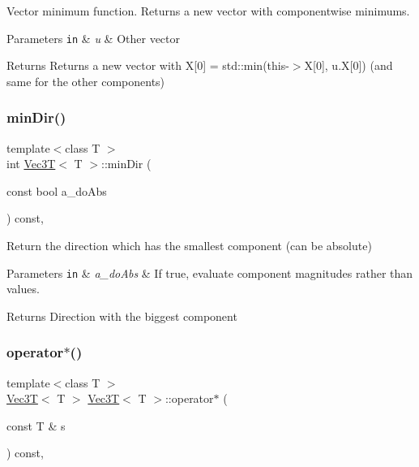 Vector minimum function. Returns a new vector with componentwise minimums. 


\begin{DoxyParams}[1]{Parameters}
\mbox{\tt in}  & {\em u} & Other vector \\
\hline
\end{DoxyParams}
\begin{DoxyReturn}{Returns}
Returns a new vector with X\mbox{[}0\mbox{]} = std\+::min(this-\/$>$X\mbox{[}0\mbox{]}, u.\+X\mbox{[}0\mbox{]}) (and same for the other components) 
\end{DoxyReturn}
\mbox{\label{classVec3T_add4db9b06b01f85ce492742acae86545}} 
\subsubsection{\texorpdfstring{min\+Dir()}{minDir()}}
{\footnotesize\ttfamily template$<$class T $>$ \\
int \hyperlink{classVec3T}{Vec3T}$<$ T $>$\+::min\+Dir (\begin{DoxyParamCaption}\item[{const bool}]{a\+\_\+do\+Abs }\end{DoxyParamCaption}) const\hspace{0.3cm}{\ttfamily [inline]}, {\ttfamily [noexcept]}}



Return the direction which has the smallest component (can be absolute) 


\begin{DoxyParams}[1]{Parameters}
\mbox{\tt in}  & {\em a\+\_\+do\+Abs} & If true, evaluate component magnitudes rather than values. \\
\hline
\end{DoxyParams}
\begin{DoxyReturn}{Returns}
Direction with the biggest component 
\end{DoxyReturn}
\mbox{\label{classVec3T_aa4768276707889db34a716e9e476b9f1}} 
\subsubsection{\texorpdfstring{operator$\ast$()}{operator*()}\hspace{0.1cm}{\footnotesize\ttfamily [1/2]}}
{\footnotesize\ttfamily template$<$class T $>$ \\
\hyperlink{classVec3T}{Vec3T}$<$ T $>$ \hyperlink{classVec3T}{Vec3T}$<$ T $>$\+::operator$\ast$ (\begin{DoxyParamCaption}\item[{const T \&}]{s }\end{DoxyParamCaption}) const\hspace{0.3cm}{\ttfamily [inline]}, {\ttfamily [noexcept]}}



